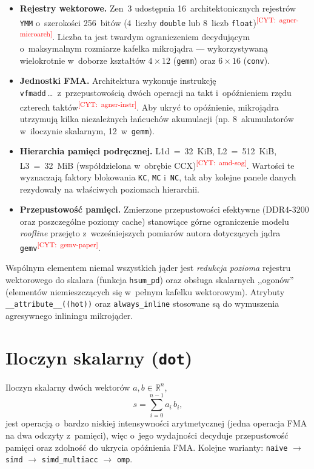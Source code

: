 \documentclass[a4paper,12pt]{book} %
\newcommand{\todocite}[1]{\textsuperscript{\textcolor{red}{[CYT:~#1]}}}
\newcommand{\kod}[1]{\texttt{#1}}
\begin{document}
\begin{itemize}
\item \textbf{Rejestry wektorowe.} Zen~3 udostępnia 16~architektonicznych
  rejestrów \kod{YMM} o~szerokości 256~bitów (4~liczby \kod{double} lub
  8~liczb \kod{float})\todocite{agner-microarch}. Liczba ta jest twardym
  ograniczeniem decydującym o~maksymalnym rozmiarze kafelka mikrojądra ---
  wykorzystywaną wielokrotnie w~doborze kształtów $4\times12$ (\kod{gemm}) oraz
  $6\times16$ (\kod{conv}).
\item \textbf{Jednostki FMA.} Architektura wykonuje instrukcję
  \kod{vfmadd}\,\ldots\ z~przepustowością dwóch operacji na takt i~opóźnieniem
  rzędu czterech taktów\todocite{agner-instr}. Aby ukryć to opóźnienie,
  mikrojądra utrzymują kilka niezależnych łańcuchów akumulacji (np. 8~akumulatorów
  w~iloczynie skalarnym, 12~w~\kod{gemm}).
\item \textbf{Hierarchia pamięci podręcznej.} L1d~=~32~KiB, L2~=~512~KiB,
  L3~=~32~MiB (współdzielona w~obrębie CCX)\todocite{amd-sog}. Wartości te
  wyznaczają faktory blokowania \kod{KC}, \kod{MC} i~\kod{NC}, tak aby kolejne
  panele danych rezydowały na właściwych poziomach hierarchii.
\item \textbf{Przepustowość pamięci.} Zmierzone przepustowości efektywne
  (DDR4-3200 oraz poszczególne poziomy cache) stanowiące górne ograniczenie
  modelu \emph{roofline} przejęto z~wcześniejszych pomiarów autora dotyczących
  jądra \kod{gemv}\todocite{gemv-paper}.
\end{itemize}

Wspólnym elementem niemal wszystkich jąder jest \emph{redukcja pozioma}
rejestru wektorowego do skalara (funkcja \kod{hsum\_pd}) oraz obsługa skalarnych
,,ogonów'' (elementów niemieszczących się w~pełnym kafelku wektorowym). Atrybuty
\kod{\_\_attribute\_\_((hot))} oraz \kod{always\_inline} stosowane są do
wymuszenia agresywnego inliningu mikrojąder.

\section{Iloczyn skalarny (\kod{dot})}
\label{sec:dot}

Iloczyn skalarny dwóch wektorów $a,b\in\mathbb{R}^{n}$,
\begin{equation}
s = \sum_{i=0}^{n-1} a_i\,b_i,
\label{eq:dot}
\end{equation}
jest operacją o~bardzo niskiej intensywności arytmetycznej (jedna operacja FMA
na dwa odczyty z~pamięci), więc o~jego wydajności decyduje przepustowość pamięci
oraz zdolność do ukrycia opóźnienia FMA. Kolejne warianty: \kod{naive}
$\rightarrow$ \kod{simd} $\rightarrow$ \kod{simd\_multiacc} $\rightarrow$ \kod{omp}.
\end{document}
